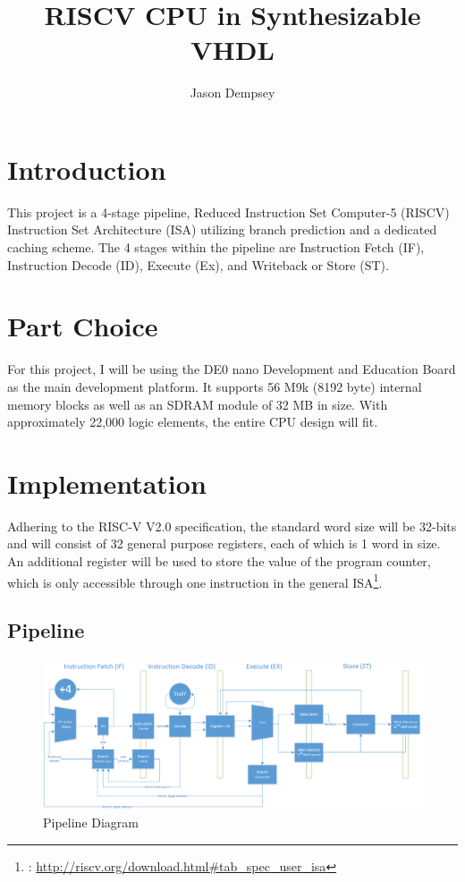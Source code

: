 \documentclass[11pt]{article}
\author{Jason Dempsey}
\date{}
\title{RISCV CPU in Synthesizable VHDL}
\begin{document}
\maketitle


\section{Introduction}
\label{sec-1}
This project is a 4-stage pipeline, Reduced Instruction Set Computer-5 (RISCV) Instruction Set Architecture (ISA) utilizing branch prediction and a dedicated caching scheme. The 4 stages within the pipeline are Instruction Fetch (IF), Instruction Decode (ID), Execute (Ex), and Writeback or Store (ST).

\section{Part Choice}
\label{sec-2}
For this project, I will be using the DE0 nano Development and Education Board as the main development platform. It supports 56 M9k (8192 byte) internal memory blocks as well as an SDRAM module of 32 MB in size. With approximately 22,000 logic elements, the entire CPU design will fit.
\section{Implementation}
\label{sec-3}
Adhering to the RISC-V V2.0 specification, the standard word size will be 32-bits and will consist of 32 general purpose registers, each of which is 1 word in size. An additional register will be used to store the value of the program counter, which is only accessible through one instruction in the general ISA\footnote{: \url{http://riscv.org/download.html#tab_spec_user_isa}}.


\subsection{Pipeline}
\label{sec-3-1}

\begin{figure}[htb]
\centering
\includegraphics[width=.9\linewidth]{./bd.png}
\caption{\label{fig:pipeline}Pipeline Diagram}
\end{figure}
\end{document}
